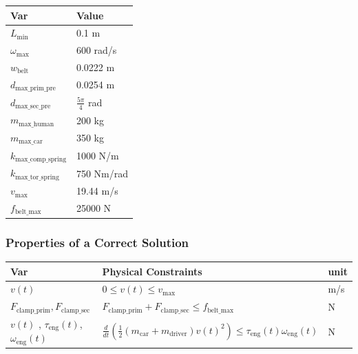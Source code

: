 \documentclass[12pt]{article}
\begin{document}
\begin{table}[H]
\caption{Specification Parameter Values} \label{TblSpecParams}
\renewcommand{\arraystretch}{1.2}
\noindent \begin{longtable*}{l l} 
  \toprule
  \textbf{Var} & \textbf{Value} \\
  \midrule 
  $L_\text{min}$ & 0.1 \si{\metre}\\
  $\omega_\text{max}$ & 600 rad/s\\
  $w_\text{belt}$ & 0.0222 m\\
  $d_\text{max\_prim\_pre}$ & 0.0254 m\\
  $d_\text{max\_sec\_pre}$ & $\frac{5\pi}{4}$ rad\\
  $m_\text{max\_human}$ & 200 kg\\
  $m_\text{max\_car}$ & 350 kg\\
  $k_\text{max\_comp\_spring}$ & 1000 N/m\\
  $k_\text{max\_tor\_spring}$ & 750 Nm/rad\\
  $v_\text{max}$ & 19.44 m/s\\
  $f_\text{belt\_max}$ & 25000 N\\
  \bottomrule
\end{longtable*}
\end{table}

\subsubsection{Properties of a Correct Solution} \label{sec_CorrectSolution}

\noindent

\begin{table}[H]
\caption{Output Variables} \label{TblOutputVar}
\renewcommand{\arraystretch}{1.2}
\noindent \begin{longtable*}{l l l} 
  \toprule
  \textbf{Var} & \textbf{Physical Constraints} & \textbf{unit}\\
  \midrule 
  $v(t)$ & $0 \leq v(t) \leq v_\text{max}$& m/s\\
  $F_{\text{clamp\_prim}}, F_{\text{clamp\_sec}}$ & $F_{\text{clamp\_prim}} + F_{\text{clamp\_sec}} \leq f_\text{belt\_max}$ & N \\
  $v(t)$ , $\tau_\text{eng}(t)$,  $\omega_\text{eng}(t)$ & $\frac{d}{dt}(\frac{1}{2}(m_\text{car}+m_\text{driver})v(t)^2) \leq \tau_\text{eng}(t) \omega_\text{eng}(t)$ & N\\
  \bottomrule
\end{longtable*}
\end{table}
\end{document}
